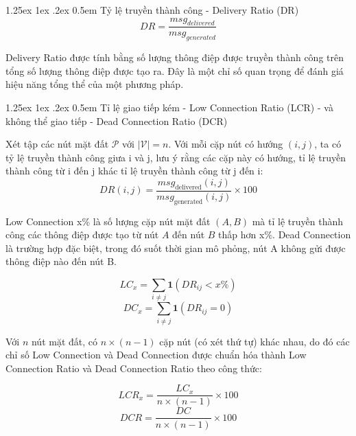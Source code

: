 \documentclass[a4paper]{article}
\makeatletter
\renewcommand{\paragraph}{%
  \@startsection{paragraph}{4}{\z@}%
  {1.25ex \@plus 1ex \@minus .2ex}%
  {0.5em}%
  {\normalfont\normalsize\bfseries}%
}
\makeatother
\begin{document}
\paragraph{Tỷ lệ truyền thành công - Delivery Ratio (DR)}
\begin{equation}
  DR = \frac {msg_{delivered}}{msg_{generated}}
\end{equation}

Delivery Ratio được tính bằng số lượng thông điệp được truyền thành công trên tổng số lượng thông điệp được tạo ra. Đây là một chỉ số quan trọng để đánh giá hiệu năng tổng thể của một phương pháp.

\paragraph{Tỉ lệ giao tiếp kém - Low Connection Ratio (LCR) - và không thể giao tiếp - Dead Connection Ratio (DCR)}

Xét tập các nút mặt đất $\mathcal{P}$ với $|\mathcal{V}| = n$. Với mỗi cặp nút có hướng $(i, j)$, ta có tỷ lệ truyền thành công giưa i và j, lưu ý rằng các cặp này có hướng, tỉ lệ truyền thành công từ i đến j khác tỉ lệ truyền thành công từ j đến i:
\begin{equation}
  DR(i,j) = \frac{msg_{\text{delivered}}(i,j)}{msg_{\text{generated}}(i,j) } \times 100
\end{equation}

Low Connection x\% là số lượng cặp nút mặt đất $(A, B)$ mà tỉ lệ truyền thành công các thông điệp được tạo từ nút $A$ đến nút $B$ thấp hơn x\%. Dead Connection là trường hợp đặc biệt, trong đó suốt thời gian mô phỏng, nút A không gửi được thông điệp nào đến nút B. 

\begin{equation}
  LC_x = \sum_{i \neq j} \mathbf{1}\left(DR_{ij} < x\%\right)
\end{equation}
\begin{equation}
  DC_x = \sum_{i \neq j} \mathbf{1}\left(DR_{ij} = 0\right)
\end{equation}

Với $n$ nút mặt đất, có $n \times (n-1)$ cặp nút (có xét thứ tự) khác nhau, do đó các chỉ số Low Connection và Dead Connection được chuẩn hóa thành Low Connection Ratio và Dead Connection Ratio theo công thức:

\begin{equation}
  LCR_x=\frac{LC_x}{n\times (n-1)} \times 100
\end{equation}
\begin{equation}
  DCR = \frac{DC}{n\times (n-1)} \times 100
\end{equation}
\end{document}
